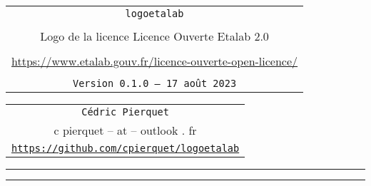 \documentclass[french,11pt,a4paper]{article}
\def\TPversion{0.1.0}
\def\TPdate{17 août 2023}
\begin{document}
\pagestyle{fancy}

\thispagestyle{empty}

\begin{center}
	\begin{minipage}{0.88\linewidth}
	\begin{tcolorbox}[colframe=yellow,colback=yellow!15]
		\begin{center}
			\begin{tabular}{c}
				{\Huge \texttt{logoetalab}}\\
				\\
				{\LARGE Logo de la licence \og Licence Ouverte Etalab 2.0 \fg} \\
				\\
				\url{https://www.etalab.gouv.fr/licence-ouverte-open-licence/} \\
				\\
				{\small \texttt{Version \TPversion{} -- \TPdate}}
		\end{tabular}
		\end{center}
	\end{tcolorbox}
\end{minipage}
\end{center}

\begin{center}
	\begin{tabular}{c}
	\texttt{Cédric Pierquet}\\
	{\ttfamily c pierquet -- at -- outlook . fr}\\
	\texttt{\url{https://github.com/cpierquet/logoetalab}}
\end{tabular}
\end{center}

\hrule


\hypertarget{matoc}{}

\tableofcontents

\vspace*{5mm}

\hrule

\vspace*{5mm}

\vfill
\end{document}

